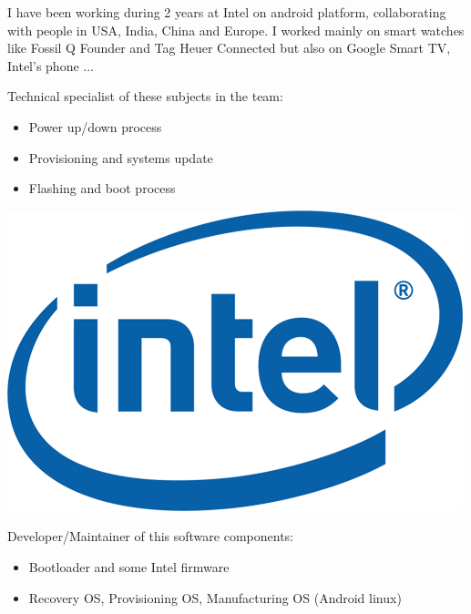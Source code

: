 \documentclass[letterpaper]{jm-cv} %
\begin{document}



\small{

  I have been working during 2 years at Intel on android platform, collaborating with people in USA, India, China and Europe. I worked mainly on smart watches like Fossil Q Founder and Tag Heuer Connected but also on Google Smart TV, Intel's phone ...

  \vspace{0.2cm}
  \begin{minipage}{.7\textwidth}
      {\footnotesize\color{maingray}\bullet} Technical specialist of these subjects in the team:
  \begin{itemize}
  \item[\color{mainblue}\faArrowRight] Power up/down process
  \item[\color{mainblue}\faArrowRight] Provisioning and systems update
  \item[\color{mainblue}\faArrowRight] Flashing and boot process
  \end{itemize}
  \end{minipage}%
  \begin{minipage}{.3\textwidth}
    \center
    \includegraphics[scale=0.13]{logo-intel.png}
  \end{minipage}
  \vspace{0.2cm}

  {\footnotesize\color{maingray}\bullet}  Developer/Maintainer of this software components:
  \vspace{-0.2cm}
  \begin{itemize}
  \item[\color{mainblue}\faArrowRight] Bootloader and some Intel firmware
  \item[\color{mainblue}\faArrowRight] Recovery OS, Provisioning OS, Manufacturing OS (Android linux)
  \end{itemize}

}
\end{document}
